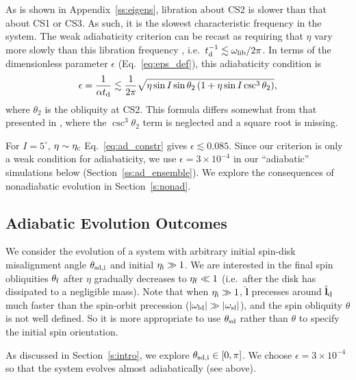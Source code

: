 \documentclass[
        fleqn,
        usenatbib,
        referee,
    ]{mnras}
\newcommand*{\abs}[1]{\left|#1\right|}
\newcommand*{\bm}[1]{\boldsymbol{\mathbf{#1}}}
\newcommand*{\uv}[1]{\hat{\bm{#1}}}
\newcommand*{\p}[1]{\left(#1\right)}
\begin{document}
As is shown in Appendix~\ref{ss:eigens}, libration about CS2 is slower than that
about CS1 or CS3. As such, it is the slowest characteristic frequency in the
system. The weak adiabaticity criterion can be recast as requiring that $\eta$
vary more slowly than this libration frequency
\citep[see][]{ward2004II,millholland_disk}, i.e.\ $t_{\rm d}^{-1} \lesssim
\omega_{\rm lib} / 2\pi$. In terms of the dimensionless parameter $\epsilon$
(Eq.~\eqref{eq:eps_def}), this adiabaticity condition is
\begin{equation}
    \epsilon = \frac{1}{\alpha t_{\rm d}}
        \lesssim \frac{1}{2\pi}\sqrt{\eta\sin I \sin \theta_2
            \p{1 + \eta \sin I \csc^3 \theta_2}},
            \label{eq:ad_constr}
\end{equation}
where $\theta_2$ is the obliquity at CS2. This formula differs somewhat from
that presented in \citet{millholland_disk}, where the $\csc^3\theta_2$ term is
neglected and a square root is missing.

For $I = 5^\circ$, $\eta \sim \eta_{\rm c}$ Eq.~\eqref{eq:ad_constr} gives $\epsilon
\lesssim 0.085$. Since our criterion is only a weak condition for adiabaticity,
we use $\epsilon = 3 \times 10^{-4}$ in our ``adiabatic'' simulations below
(Section~\autoref{ss:ad_ensemble}). We explore the consequences of nonadiabatic
evolution in Section~\ref{s:nonad}.

\subsection{Adiabatic Evolution Outcomes}\label{ss:ad_ensemble}

We consider the evolution of a system with arbitrary initial spin-disk
misalignment angle $\theta_{\rm sd, i}$ and initial $\eta_{\rm i} \gg 1$. We are
interested in the final spin obliquities $\theta_{\rm f}$ after $\eta$ gradually
decreases to $\eta_{\rm f} \ll 1$ (i.e.\ after the disk has dissipated to a
negligible mass). Note that when $\eta_{\rm i} \gg 1$, $\uv{l}$ precesses
around $\uv{l}_{\rm d}$ much faster than the spin-orbit precession
($\abs{\omega_{\rm ld}} \gg \abs{\omega_{\rm sl}}$), and the spin obliquity
$\theta$ is not well defined. So it is more appropriate to use $\theta_{\rm sd}$
rather than $\theta$ to specify the initial spin orientation.

As discussed in Section~\ref{s:intro}, we explore $\theta_{\rm sd, i} \in [0,
\pi]$. We choose $\epsilon = 3 \times 10^{-4}$ so that the system evolves almost
adiabatically (see above).
\end{document}
